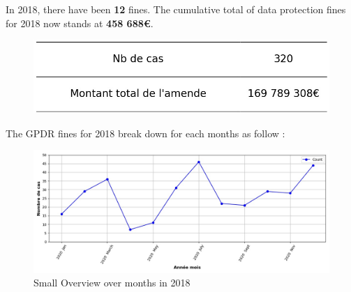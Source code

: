 \documentclass[12pt]{article}
\begin{document}
\newpage




	\begin{multicols}{2}
	
	In 2018, there have been \textbf{12} fines.
	The cumulative total of data protection fines for 2018 now stands at \textbf{458 688€}.
	
	\begin{figure}[H]
	\centering\includegraphics[width=1\linewidth]{graphs/counter_year}
	\end{figure}


	The GPDR fines for 2018 break down for each months as follow :

	\begin{figure}
	[H]\centering\includegraphics[width = 1.2\linewidth]{graphs/NbFinesPerMonth_year_graph}
	\caption{Small Overview over months in 2018}
	\end{figure}

	\end{multicols}
\end{document}
